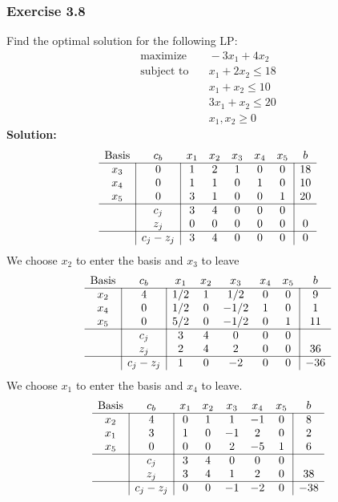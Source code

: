\documentclass[11pt]{article}
\begin{document}
\subsubsection{Exercise 3.8}
Find the optimal solution for the following LP:
\begin{align}
  \text{maximize} & \quad -3x_1 + 4x_2 \\
  \text{subject to} & \quad x_1 + 2x_2 \leq 18 \\
  & \quad x_1 + x_2 \leq 10 \\
  & \quad 3x_1 + x_2 \leq 20 \\
  & \quad x_1, x_2 \geq 0
\end{align}
\textbf{Solution:}
\[
\begin{array}{c|c|ccccc|c}
    \text{Basis} & c_b & x_1 & x_2 & x_3 & x_4 & x_5 & b \\ \hline
    x_3 & 0 & 1 & 2 & 1 & 0 & 0 & 18 \\
    x_4 & 0 & 1 & 1 & 0 & 1 & 0 & 10 \\
    x_5 & 0 & 3 & 1 & 0 & 0 & 1 & 20 \\ \hline
        & c_j & 3 & 4 & 0 & 0 & 0 \\
        & z_j & 0 & 0 & 0 & 0 & 0 & 0 \\ \hline
        & c_j - z_j & 3 & 4 & 0 & 0 & 0 & 0
\end{array}
\]
We choose $x_2$ to enter the basis and $x_3$ to leave
\[
\begin{array}{c|c|ccccc|c}
    \text{Basis} & c_b & x_1 & x_2 & x_3 & x_4 & x_5 & b \\ \hline
    x_2 & 4 & 1/2 & 1 & 1/2 & 0 & 0 & 9 \\
    x_4 & 0 & 1/2 & 0 & -1/2 & 1 & 0 & 1 \\
    x_5 & 0 & 5/2 & 0 & -1/2 & 0 & 1 & 11 \\ \hline
        & c_j & 3 & 4 & 0 & 0 & 0 \\
        & z_j & 2 & 4 & 2 & 0 & 0 & 36 \\ \hline
        & c_j - z_j & 1 & 0 & -2 & 0 & 0 & -36
\end{array}
\]
We choose $x_1$ to enter the basis and $x_4$ to leave.
\[
\begin{array}{c|c|ccccc|c}
    \text{Basis} & c_b & x_1 & x_2 & x_3 & x_4 & x_5 & b \\ \hline
    x_2 & 4 & 0 & 1 & 1 & -1 & 0 & 8 \\
    x_1 & 3 & 1 & 0 & -1 & 2 & 0 & 2 \\
    x_5 & 0 & 0 & 0 & 2 & -5 & 1 & 6 \\ \hline
        & c_j & 3 & 4 & 0 & 0 & 0 \\
        & z_j & 3 & 4 & 1 & 2 & 0 & 38 \\ \hline
        & c_j - z_j & 0 & 0 & -1 & -2 & 0 & -38
\end{array}
\]
\end{document}
